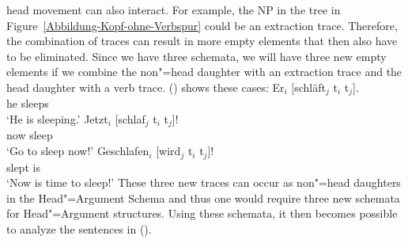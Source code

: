 head movement can also interact. For example, the NP in the tree in 
Figure~\ref{Abbildung-Kopf-ohne-Verbspur} could be an extraction trace. Therefore, the combination of traces can result in more empty elements that then
also have to be eliminated. Since we have three schemata, we will have three new empty elements if we combine the non"=head daughter with an extraction
trace and the head daughter with a verb trace. () shows these cases:
\eal\settowidth{}
\ex 
\gll Er$_i$    [schläft$_j$ t$_i$ t$_j$].\\
	 he \spacebr{}sleeps\\  
\glt `He is sleeping.'
\ex 
\gll Jetzt$_i$ [schlaf$_j$ t$_i$ t$_j$]!\\
	 now \spacebr{}sleep\\   
\glt `Go to sleep now!'
\ex 
\gll Geschlafen$_i$ [wird$_j$ t$_i$ t$_j$]! \\
	 slept \spacebr{}is\\
\glt `Now is time to sleep!'
\zl
These three new traces can occur as non"=head daughters in the Head"=Argument Schema and thus one would require
three new schemata for Head"=Argument structures. Using these schemata, it then becomes possible to analyze
the sentences in ().

